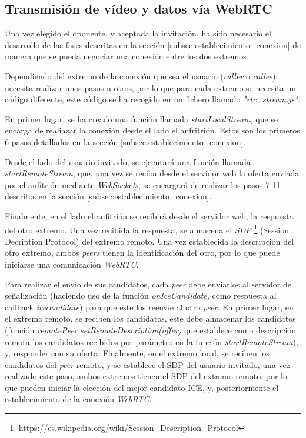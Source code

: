 \documentclass[a4paper, 12pt]{book}
\begin{document}
\subsection{Transmisión de vídeo y datos vía WebRTC}

Una vez elegido el oponente, y aceptada la invitación, ha sido necesario el desarrollo de las fases descritas en la sección \ref{subsec:establecimiento_conexion} de manera que se pueda negociar una conexión entre los dos extremos.

Dependiendo del extremo de la conexión que sea el usuario (\emph{caller} o \emph{callee}), necesita realizar unos pasos u otros, por lo que para cada extremo se necesita un código diferente, este código se ha recogido en un fichero llamado \emph{"rtc\_stream.js"}.

En primer lugar, se ha creado una función llamada \emph{startLocalStream}, que se encarga de realiazar la conexión desde el lado el anfritrión. Estos son los primeros 6 pasos detallados en la sección \ref{subsec:establecimiento_conexion}.

Desde el lado del usuario invitado, se ejecutará una función llamada \emph{startRemoteStream}, que, una vez se reciba desde el servidor web la oferta enviada por el anfitrión mediante \emph{WebSockets}, se encargará de realizar los pasos 7-11 descritos en la sección \ref{subsec:establecimiento_conexion}.

Finalmente, en el lado el anfitrión se recibirá desde el servidor web, la respuesta del otro extremo. Una vez recibida la respuesta, se almacena el \emph{SDP} \footnote{\url{https://es.wikipedia.org/wiki/Session_Description_Protocol}} (Session Decription Protocol) del extremo remoto. Una vez establecida la descripción del otro extremo, ambos \emph{peers} tienen la identificación del otro, por lo que puede iniciarse una comunicación \emph{WebRTC}.

Para realizar el envío de sus candidatos, cada \emph{peer} debe enviarlos al servidor de señalización (haciendo uso de la función \emph{onIceCandidate}, como respuesta al callback \emph{icecandidate}) para que este los reenvíe al otro \emph{peer}. En primer lugar, en el extremo remoto, se reciben los candidatos, este debe almacenar los candidatos (función \emph{remotePeer.setRemoteDescription(offer)} que establece como descripción remota los candidatos recibidos por parámetro en la función \emph{startRemoteStream}), y, responder con su oferta. Finalmente, en el extremo local, se reciben los candidatos del \emph{peer} remoto, y se establece el SDP del usuario invitado, una vez realizado este paso, ambos extremos tienen el SDP del extremo remoto, por lo que pueden iniciar la elección del mejor candidato ICE, y, posteriormente el establecimiento de la conexión \emph{WebRTC}.
\end{document}
